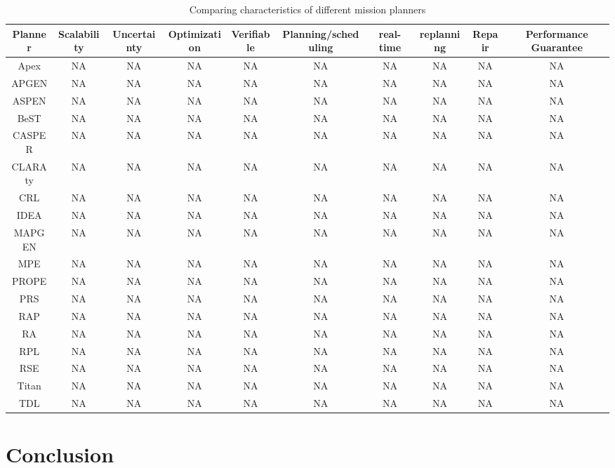 \documentclass[conference]{IEEEtran}
\begin{document}
   \begin{table*}[t]
     \centering
     \caption{Comparing characteristics of different mission planners} 
     \begin{tabular}{c|c|c|c|c|c|c|c|c|c}
     \hline
     Planner & Scalability & Uncertainty  & Optimization & Verifiable  & Planning/scheduling   &real-time &replanning  &Repair  & Performance Guarantee\\
        \hline
        Apex &NA &NA &NA &NA &NA &NA &NA &NA &NA\\
        APGEN &NA &NA &NA &NA &NA &NA &NA &NA &NA\\
        ASPEN &NA &NA &NA &NA &NA &NA &NA &NA &NA\\
        BeST &NA &NA &NA &NA &NA &NA &NA &NA &NA\\
        CASPER  &NA &NA &NA &NA &NA &NA &NA &NA &NA\\
        CLARAty &NA &NA &NA &NA &NA &NA &NA &NA &NA\\
        CRL &NA &NA &NA &NA &NA &NA &NA &NA &NA\\
        IDEA &NA &NA &NA &NA &NA &NA &NA &NA &NA\\
        MAPGEN &NA &NA &NA &NA &NA &NA &NA &NA &NA\\
        MPE &NA &NA &NA &NA &NA &NA &NA &NA &NA\\
        PROPE &NA &NA &NA &NA &NA &NA &NA &NA &NA\\
        PRS &NA &NA &NA &NA &NA &NA &NA &NA &NA\\
        RAP &NA &NA &NA &NA &NA &NA &NA &NA &NA\\
        RA &NA &NA &NA &NA &NA &NA &NA &NA &NA\\   
        RPL &NA &NA &NA &NA &NA &NA &NA &NA &NA\\  
        RSE &NA &NA &NA &NA &NA &NA &NA &NA &NA\\
        Titan &NA &NA &NA &NA &NA &NA &NA &NA &NA\\
        TDL &NA &NA &NA &NA &NA &NA &NA &NA &NA\\
        \hline
      \end{tabular}
    \end{table*}


\section{Conclusion}
\end{document}
